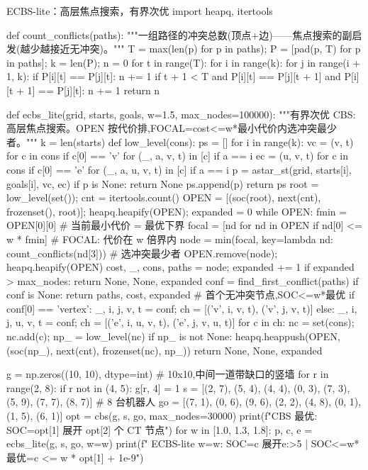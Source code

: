 \begin{codebox}[Python]{ECBS-lite：高层焦点搜索，有界次优}
import heapq, itertools

def count_conflicts(paths):
    """一组路径的冲突总数(顶点+边)——焦点搜索的副启发(越少越接近无冲突)。"""
    T = max(len(p) for p in paths); P = [pad(p, T) for p in paths]; k = len(P); n = 0
    for t in range(T):
        for i in range(k):
            for j in range(i + 1, k):
                if P[i][t] == P[j][t]: n += 1
                if t + 1 < T and P[i][t] == P[j][t + 1] and P[i][t + 1] == P[j][t]: n += 1
    return n

def ecbs_lite(grid, starts, goals, w=1.5, max_nodes=100000):
    """有界次优 CBS:高层焦点搜索。OPEN 按代价排,FOCAL={cost<=w*最小代价}内选冲突最少者。"""
    k = len(starts)
    def low_level(cons):
        ps = []
        for i in range(k):
            vc = {(v, t) for c in cons if c[0] == 'v' for (_, a, v, t) in [c] if a == i}
            ec = {(u, v, t) for c in cons if c[0] == 'e' for (_, a, u, v, t) in [c] if a == i}
            p = astar_st(grid, starts[i], goals[i], vc, ec)
            if p is None: return None
            ps.append(p)
        return ps
    root = low_level(set()); cnt = itertools.count()
    OPEN = [(soc(root), next(cnt), frozenset(), root)]; heapq.heapify(OPEN); expanded = 0
    while OPEN:
        fmin = OPEN[0][0]                                   # 当前最小代价 = 最优下界
        focal = [nd for nd in OPEN if nd[0] <= w * fmin]    # FOCAL: 代价在 w 倍界内
        node = min(focal, key=lambda nd: count_conflicts(nd[3]))   # 选冲突最少者
        OPEN.remove(node); heapq.heapify(OPEN)
        cost, _, cons, paths = node; expanded += 1
        if expanded > max_nodes: return None, None, expanded
        conf = find_first_conflict(paths)
        if conf is None: return paths, cost, expanded       # 首个无冲突节点,SOC<=w*最优
        if conf[0] == 'vertex':
            _, i, j, v, t = conf; ch = [('v', i, v, t), ('v', j, v, t)]
        else:
            _, i, j, u, v, t = conf; ch = [('e', i, u, v, t), ('e', j, v, u, t)]
        for c in ch:
            nc = set(cons); nc.add(c); np_ = low_level(nc)
            if np_ is not None:
                heapq.heappush(OPEN, (soc(np_), next(cnt), frozenset(nc), np_))
    return None, None, expanded

g = np.zeros((10, 10), dtype=int)                          # 10x10,中间一道带缺口的竖墙
for r in range(2, 8):
    if r not in (4, 5): g[r, 4] = 1
s  = [(2, 7), (5, 4), (4, 4), (0, 3), (7, 3), (5, 9), (7, 7), (8, 7)]   # 8 台机器人
go = [(7, 1), (0, 6), (9, 6), (2, 2), (4, 8), (0, 1), (1, 5), (6, 1)]
opt = cbs(g, s, go, max_nodes=30000)
print(f"CBS 最优: SOC={opt[1]} 展开 {opt[2]} 个 CT 节点")
for w in [1.0, 1.3, 1.8]:
    p, c, e = ecbs_lite(g, s, go, w=w)
    print(f"  ECBS-lite w={w}: SOC={c} 展开{e:>5} | SOC<=w*最优={c <= w * opt[1] + 1e-9}")
\end{codebox}

